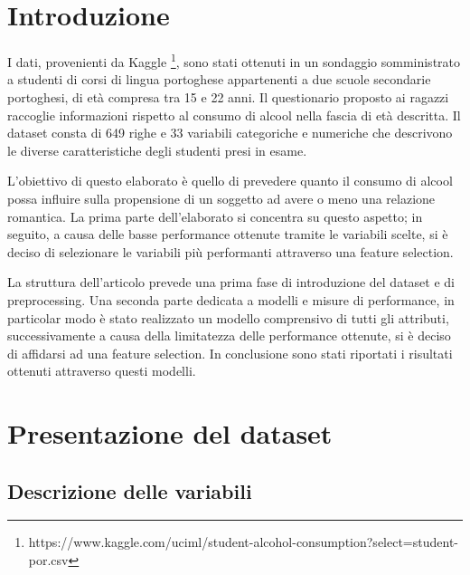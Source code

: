 \documentclass[12pt,a4paper]{report}
\begin{document}
\begin{multicols}{2}

	\chapter{Introduzione}
		I dati, provenienti da Kaggle \footnote{https://www.kaggle.com/uciml/student-alcohol-consumption?select=student-por.csv}, sono stati ottenuti in un sondaggio somministrato a studenti di corsi di lingua portoghese appartenenti a due scuole secondarie portoghesi, di età compresa tra 15 e 22 anni. Il questionario proposto ai ragazzi raccoglie informazioni rispetto al consumo di alcool nella fascia di età descritta.
		Il dataset consta di 649 righe e 33 variabili categoriche e numeriche che descrivono le diverse caratteristiche degli studenti presi in esame. 
		
		L’obiettivo di questo elaborato è quello di prevedere quanto il consumo di alcool possa 
		influire sulla propensione di un soggetto ad avere o meno una relazione romantica. 
		La prima parte dell’elaborato si concentra su questo aspetto; in seguito, a causa delle basse performance ottenute tramite le variabili scelte, si è deciso di selezionare le variabili più performanti attraverso una feature selection. 
		
		La struttura dell'articolo prevede una prima fase di introduzione del dataset e di preprocessing. Una seconda parte dedicata a modelli e misure di performance, in particolar modo è stato realizzato un modello comprensivo di tutti gli attributi, successivamente a causa della limitatezza delle performance ottenute, si è deciso di affidarsi ad una feature selection. In conclusione sono stati riportati i risultati ottenuti attraverso questi modelli.
		
	\chapter{Presentazione del dataset}
	\section{Descrizione delle variabili}
	

\end{multicols}
\end{document}
